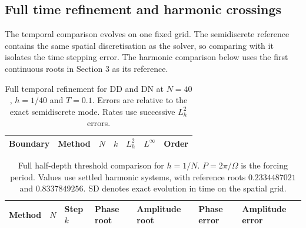 \clearpage
\subsection{Full time refinement and harmonic crossings}
The temporal comparison evolves on one fixed grid. The semidiscrete reference contains the same spatial discretisation as the solver, so comparing with it isolates the time stepping error. The harmonic comparison below uses the first continuous roots in Section 3 as its reference.

\begin{table}[!ht]\centering
\caption{Full temporal refinement for DD and DN at $N=40$, $h=1/40$ and $T=0.1$. Errors are relative to the exact semidiscrete mode. Rates use successive $L^2_h$ errors.}
\small
\begin{tabular}{@{}llrrrrr@{}}\toprule
Boundary & Method & $N$ & $k$ & $L^2_h$ & $L^\infty$ & Order \\ \midrule
%
\end{tabular}
\end{table}

\begin{table}[!ht]\centering
\caption{Full half-depth threshold comparison for $h=1/N$. $P=2\pi/\Omega$ is the forcing period. Values use settled harmonic systems, with reference roots $0.2334487021$ and $0.8337849256$. SD denotes exact evolution in time on the spatial grid.}
\small
\begin{tabular}{@{}lrlllll@{}}\toprule
Method & $N$ & Step $k$ & Phase root & Amplitude root & Phase error & Amplitude error \\ \midrule
%
\end{tabular}
\end{table}
